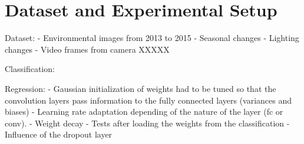\section{Dataset and Experimental Setup}
Dataset:
- Environmental images from 2013 to 2015
- Seasonal changes
- Lighting changes
- Video frames from camera XXXXX

Classification:




Regression:
- Gaussian initialization of weights had to be tuned so that the convolution layers pass information to the fully connected layers (variances and biases)
- Learning rate adaptation depending of the nature of the layer (fc or conv).
- Weight decay
- Tests after loading the weights from the classification
- Influence of the dropout layer
